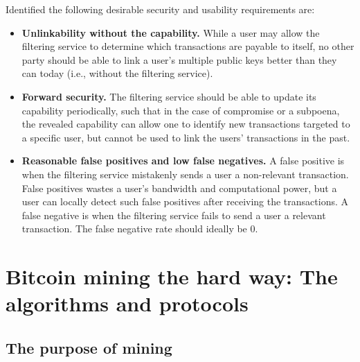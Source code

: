 Identified the following desirable security and usability requirements are:

\begin{itemize}
	\item \textbf{Unlinkability without the capability.} While a user may allow the filtering service
to determine which transactions are payable to itself, no other party should be able
to link a user’s multiple public keys better than they can today (i.e., without the
filtering service).
	\item \textbf{Forward security.} The filtering service should be able to update its capability periodically,
such that in the case of compromise or a subpoena, the revealed capability
can allow one to identify new transactions targeted to a specific user, but cannot be
used to link the users’ transactions in the past.
	\item \textbf{Reasonable false positives and low false negatives.} A false positive is when the
filtering service mistakenly sends a user a non-relevant transaction. False positives
wastes a user’s bandwidth and computational power, but a user can locally detect
such false positives after receiving the transactions. A false negative is when the
filtering service fails to send a user a relevant transaction. The false negative rate
should ideally be 0.
\end{itemize}



\chapter{Bitcoin mining the hard way: The algorithms and protocols}
\section{The purpose of mining}

